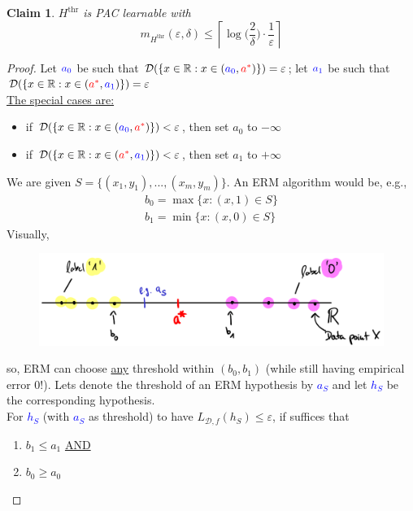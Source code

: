 \documentclass[10pt,a4paper]{article}
\newtheorem*{claim}{Claim}
\theoremstyle{remark}
\theoremstyle{definition}
\theoremstyle{plain}
\begin{document}
\begin{claim} $H^{\text{thr}}$ is PAC learnable with
$$
	m_{H^{\text{thr}}}(\varepsilon, \delta) \leq \left\lceil \log \bigg(\frac{2}{\delta}\bigg) \cdot \frac{1}{\varepsilon}\right\rceil
$$
\end{claim}

\begin{proof} Let $\textcolor{blue}{a_0}$ be such that $\mathcal{D}(\{x\in \mathbb{R}: x \in (\textcolor{blue}{a_0}, \textcolor{red}{a^*})\}) = \varepsilon$; let $\textcolor{blue}{a_1}$ be such that $\mathcal{D}(\{x\in \mathbb{R}: x \in (\textcolor{red}{a^*}, \textcolor{blue}{a_1})\}) = \varepsilon$\\
\underline{The special cases are:}
\begin{itemize}
		\item if $\mathcal{D}(\{x\in \mathbb{R}: x \in (\textcolor{blue}{a_0}, \textcolor{red}{a^*})\}) < \varepsilon$, then set $a_0$ to $-\infty$
		\item if $\mathcal{D}(\{x\in \mathbb{R}: x \in (\textcolor{red}{a^*}, \textcolor{blue}{a_1})\}) < \varepsilon$, then set $a_1$ to $+\infty$
\end{itemize}
	We are given $S = \{(x_1, y_1), ..., (x_m, y_m)\}$. An ERM algorithm would be, e.g., 
	\begin{align*}
		b_0 = \max \{x: (x,1) \in S \}\\
		b_1 = \min \{x: (x,0) \in S \}
	\end{align*}
	Visually,\\
	\begin{figure}[H]
		\centering
		\includegraphics[width=0.9\linewidth]{sketch_5}
		\label{fig:sketch5}
	\end{figure}
	
	so, ERM can choose \underline{any} threshold within $(b_0, b_1)$ (while still having empirical error 0!). Lets denote the threshold of an ERM hypothesis by \textcolor{blue}{\textbf{$a_S$}} and let \textcolor{blue}{\textbf{$h_S$}} be the corresponding hypothesis.\\
	For \textcolor{blue}{\textbf{$h_S$}} (with \textcolor{blue}{\textbf{$a_S$}} as threshold) to have $L_{\mathcal{D}, f}(h_S) \leq \varepsilon$, if suffices that
	\begin{enumerate}
		\item $b_1 \leq a_1$ \underline{AND}
		\item $b_0 \geq a_0$
	\end{enumerate}
	

\end{proof}
\end{document}
